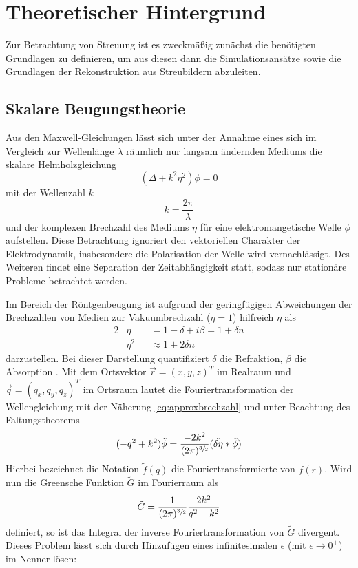 \chapter{Theoretischer Hintergrund}
\label{chap:theorie}
 Zur Betrachtung von Streuung ist es zweckmäßig zunächst die benötigten Grundlagen zu definieren, um aus diesen dann die Simulationsansätze sowie die Grundlagen der Rekonstruktion aus Streubildern abzuleiten.
\section{Skalare Beugungstheorie}
Aus den Maxwell-Gleichungen lässt sich unter der Annahme eines sich im Vergleich zur Wellenlänge $\lambda$ räumlich nur langsam ändernden Mediums die skalare Helmholzgleichung
\begin{equation}
\label{eq:wellengleichung_r}
(\Delta+k^2\eta^2)\phi=0
\end{equation}
mit der Wellenzahl $k$
\begin{equation}
	k=\frac{2\pi}{\lambda}
\end{equation} und der komplexen Brechzahl des Mediums $\eta$ für eine elektromangetische Welle $\phi$ aufstellen. Diese Betrachtung ignoriert den vektoriellen Charakter der Elektrodynamik, insbesondere die Polarisation der Welle wird vernachlässigt. Des Weiteren findet eine Separation der Zeitabhängigkeit statt, sodass nur stationäre Probleme betrachtet werden.

Im Bereich der Röntgenbeugung ist aufgrund der geringfügigen Abweichungen der Brechzahlen von Medien zur Vakuumbrechzahl ($\eta=1$) hilfreich $\eta$ als
\begin{alignat}{2}
\label{eq:brechzahl}
	&\eta&&=1-\delta+i\beta=1 + \delta n \\
\label{eq:approxbrechzahl}
	&\eta^2&&\approx 1 + 2\delta n
\end{alignat}
darzustellen. Bei dieser Darstellung quantifiziert $\delta$ die Refraktion, $\beta$ die Absorption \cite{attwood1999}.
Mit dem Ortsvektor $\vec{r}=(x,y,z)^T$ im Realraum und $\vec{q}=(q_x,q_y,q_z)^T$ im Ortsraum lautet die Fouriertransformation der Wellengleichung mit der Näherung \ref{eq:approxbrechzahl} und unter Beachtung des Faltungstheorems
\begin{equation}
\label{eq:wellengleichung_f}
	(-q^2+k^2)\tilde{\phi}=\frac{-2k^2}{(2\pi)^{\sfrac{3}{2}}}(\tilde{\delta \eta} \ast \tilde{\phi})
\end{equation}
Hierbei bezeichnet die Notation $\tilde{f}(q)$ die Fouriertransformierte von $f(r)$. Wird nun die Greensche Funktion  $\tilde{G}$ im Fourierraum als
\begin{equation}
	\tilde{G}=\frac{1}{(2\pi)^{\sfrac{3}{2}}}\frac{2k^2}{q^2-k^2}
\end{equation}
definiert, so ist das Integral der inverse Fouriertransformation von $\tilde{G}$ divergent. Dieses Problem lässt sich durch Hinzufügen eines infinitesimalen  $\epsilon$ (mit $\epsilon\rightarrow 0^+$) im Nenner lösen:

